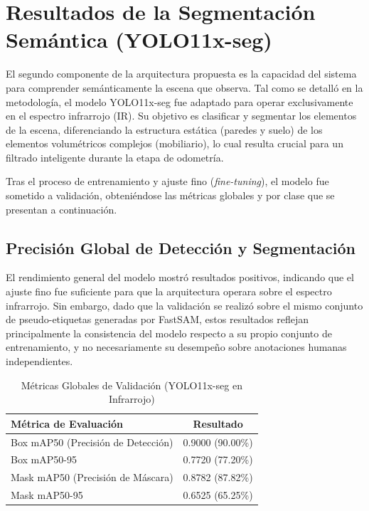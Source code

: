 \documentclass[12pt, a4, twoside, openany]{report}
\begin{document}
\section{Resultados de la Segmentación Semántica (YOLO11x-seg)}

El segundo componente de la arquitectura propuesta es la capacidad del sistema para comprender semánticamente la escena que observa. Tal como se detalló en la metodología, el modelo YOLO11x-seg fue adaptado para operar exclusivamente en el espectro infrarrojo (IR). Su objetivo es clasificar y segmentar los elementos de la escena, diferenciando la estructura estática (paredes y suelo) de los elementos volumétricos complejos (mobiliario), lo cual resulta crucial para un filtrado inteligente durante la etapa de odometría.

Tras el proceso de entrenamiento y ajuste fino (\textit{fine-tuning}), el modelo fue sometido a validación, obteniéndose las métricas globales y por clase que se presentan a continuación.

\subsection{Precisión Global de Detección y Segmentación}

El rendimiento general del modelo mostró resultados positivos, indicando que el ajuste fino fue suficiente para que la arquitectura operara sobre el espectro infrarrojo. Sin embargo, dado que la validación se realizó sobre el mismo conjunto de pseudo-etiquetas generadas por FastSAM, estos resultados reflejan principalmente la consistencia del modelo respecto a su propio conjunto de entrenamiento, y no necesariamente su desempeño sobre anotaciones humanas independientes.

\begin{table}[H]
\centering
\caption{Métricas Globales de Validación (YOLO11x-seg en Infrarrojo)}
\label{tab:yolo_global}
\begin{tabular}{lc}
\toprule
\textbf{Métrica de Evaluación} & \textbf{Resultado} \\
\midrule
Box mAP50 (Precisión de Detección) & 0.9000 (90.00\%) \\
Box mAP50-95 & 0.7720 (77.20\%) \\
Mask mAP50 (Precisión de Máscara) & 0.8782 (87.82\%) \\
Mask mAP50-95 & 0.6525 (65.25\%) \\
\bottomrule
\end{tabular}
\end{table}
\end{document}
